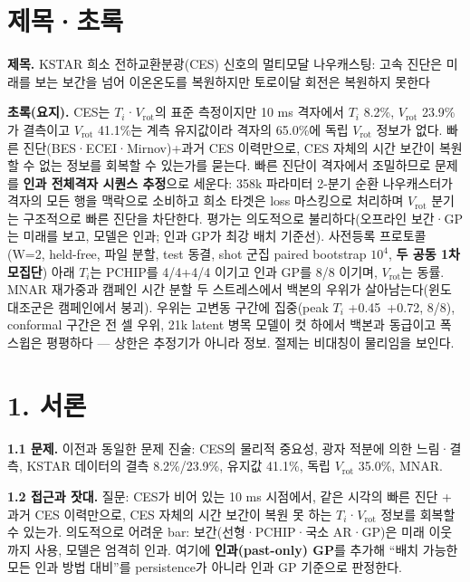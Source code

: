 \documentclass[10pt,a4paper]{article}
\newcommand{\Ti}{\ensuremath{T_i}}
\newcommand{\Vrot}{\ensuremath{V_\mathrm{rot}}}
\begin{document}
\section*{제목·초록}
\textbf{제목.} KSTAR 희소 전하교환분광(CES) 신호의 멀티모달 나우캐스팅: 고속 진단은 미래를 보는 보간을 넘어 이온온도를 복원하지만 토로이달 회전은 복원하지 못한다

\textbf{초록(요지).} CES는 \Ti·\Vrot{}의 표준 측정이지만 10 ms 격자에서 \Ti{} 8.2\%, \Vrot{} 23.9\%가 결측이고 \Vrot{} 41.1\%는 계측 유지값이라 격자의 65.0\%에 독립 \Vrot{} 정보가 없다. 빠른 진단(BES·ECEI·Mirnov)+과거 CES 이력만으로, CES 자체의 시간 보간이 복원할 수 없는 정보를 회복할 수 있는가를 묻는다. 빠른 진단이 격자에서 조밀하므로 문제를 \textbf{인과 전체격자 시퀀스 추정}으로 세운다: 358k 파라미터 2-분기 순환 나우캐스터가 격자의 모든 행을 맥락으로 소비하고 희소 타겟은 loss 마스킹으로 처리하며 \Vrot{} 분기는 구조적으로 빠른 진단을 차단한다. 평가는 의도적으로 불리하다(오프라인 보간·GP는 미래를 보고, 모델은 인과; 인과 GP가 최강 배치 기준선). 사전등록 프로토콜(W=2, held-free, 파일 분할, test 동결, shot 군집 paired bootstrap $10^4$, \textbf{두 공동 1차 모집단}) 아래 \Ti{}는 PCHIP를 4/4+4/4 이기고 인과 GP를 8/8 이기며, \Vrot{}는 동률. MNAR 재가중과 캠페인 시간 분할 두 스트레스에서 백본의 우위가 살아남는다(윈도 대조군은 캠페인에서 붕괴). 우위는 고변동 구간에 집중(peak \Ti{} +0.45~+0.72, 8/8), conformal 구간은 전 셀 우위, 21k latent 병목 모델이 컷 하에서 백본과 동급이고 폭 스윕은 평평하다 — 상한은 추정기가 아니라 정보. 절제는 비대칭이 물리임을 보인다.

\section*{1. 서론}
\textbf{1.1 문제.} 이전과 동일한 문제 진술: CES의 물리적 중요성, 광자 적분에 의한 느림·결측, KSTAR 데이터의 결측 8.2\%/23.9\%, 유지값 41.1\%, 독립 \Vrot{} 35.0\%, MNAR.

\textbf{1.2 접근과 잣대.} 질문: CES가 비어 있는 10 ms 시점에서, 같은 시각의 빠른 진단 + 과거 CES 이력만으로, CES 자체의 시간 보간이 복원 못 하는 \Ti·\Vrot{} 정보를 회복할 수 있는가. 의도적으로 어려운 bar: 보간(선형·PCHIP·국소 AR·GP)은 미래 이웃까지 사용, 모델은 엄격히 인과. 여기에 \textbf{인과(past-only) GP}를 추가해 ``배치 가능한 모든 인과 방법 대비''를 persistence가 아니라 인과 GP 기준으로 판정한다.
\end{document}
